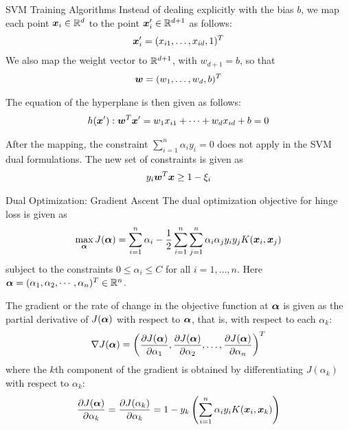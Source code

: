 \ifdefined\wox \begin{frame} \titlepage \end{frame} \fi

\begin{frame}{SVM Training Algorithms}
Instead of dealing
explicitly with the bias $b$, we map each point ${\boldsymbol x}_i \in
{\mathord{\mathbb R}}^d$ to the point ${\boldsymbol x}'_i \in {\mathord{\mathbb R}}^{d+1}$ as follows:
\begin{align*}
    {\boldsymbol x}'_i = (x_{i1},\ldots,x_{id},1)^T
\end{align*}
We also map the weight vector to ${\mathord{\mathbb R}}^{d+1}$, with
$w_{d+1} = b$,
so that
\begin{align*}
{\boldsymbol w} = (w_1, \ldots, w_d, b)^T 
\end{align*}

\medskip
The equation of the hyperplane
is then given as follows:
\begin{align*}
    h({\boldsymbol x}'): {\boldsymbol w}^T{\boldsymbol x}' = 
    w_1x_{i1} + \cdots + w_dx_{id} + b = 0
\end{align*}

\medskip
After the mapping, the constraint $\sum_{i=1}^n \alpha_i y_i =
0$ does not apply in the SVM dual formulations.
The new set of constraints is
given as
\begin{align*}
y_i {\boldsymbol w}^T{\boldsymbol x} \ge 1 - \xi_i
\end{align*}
\end{frame}



\begin{frame}{Dual Optimization: Gradient Ascent}
The dual optimization objective for
hinge loss  is given as
\begin{align*}
    \max_{{\bm \alpha}} J({\bm \alpha}) =
    \displaystyle \sum_{i=1}^n\alpha_{i} - {1 \over 2} \displaystyle \sum_{i=1}^n
  \displaystyle \sum_{j=1}^n \alpha_i\alpha_{j} y_i y_{j} K({\boldsymbol x}_i,{\boldsymbol x}_{j})
\end{align*}
subject to the constraints $0 \le \alpha_i \le C$ for all
$i=1,\ldots,n$. Here ${\bm \alpha} = (\alpha_1, \alpha_2, \cdots, \alpha_n)^T
\in {\mathord{\mathbb R}}^n$.

\medskip
The gradient or the rate of change in the objective function at
${\bm \alpha}$ is given as the partial derivative of $J({\bm \alpha})$ with
respect to ${\bm \alpha}$, that is, with respect to each $\alpha_k$:
\begin{align*}
    \nabla J({\bm \alpha}) =
   \begin{pmatrix}  \dfrac{\partial J({\bm \alpha})}{\partial \alpha_1},
    \dfrac{\partial J({\bm \alpha})}{\partial \alpha_2}, \ldots,
    \dfrac{\partial J({\bm \alpha})}{\partial \alpha_n}
     \end{pmatrix}^T
\end{align*}
where the $k$th component of the gradient is obtained by
differentiating $J(\alpha_k)$ with respect to $\alpha_k$:
\begin{align*}
    {\partial J({\bm \alpha}) \over \partial \alpha_k} =
    {\partial J(\alpha_k) \over \partial \alpha_k} =
    1 - y_k
    \left( \displaystyle \sum_{i=1}^n \alpha_i y_i K({\boldsymbol x}_i,{\boldsymbol x}_k) \right)
\end{align*}
\end{frame}


